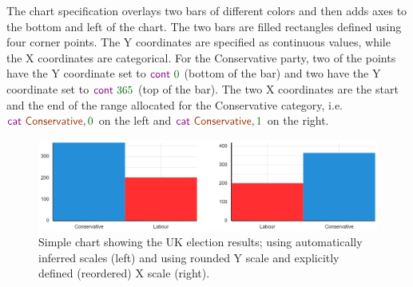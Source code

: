\documentclass{jfp}
\newcommand{\num}[1]{\textcolor{numclr}{#1}}
\newcommand{\strf}[1]{\textnormal{\textcolor{strclr}{\sffamily #1}}}
\newcommand{\kvd}[1]{\textnormal{\textcolor{kvdclr}{\sffamily #1}}}
\begin{document}
\noindent
The chart specification overlays two bars of different colors and then adds axes to the bottom and
left of the chart. The two bars are filled rectangles defined using four corner points. The Y
coordinates are specified as continuous values, while the X coordinates are categorical. For
the Conservative party, two of the points have the Y coordinate set to $\kvd{cont}~\num{0}$ (bottom of the bar)
and two have the Y coordinate set to $\kvd{cont}~\num{365}$ (top of the bar). The two X coordinates
are the start and the end of the range allocated for the \strf{Conservative} category,
i.e.~$\kvd{cat}~\strf{Conservative}, \num{0}$ on the left and $\kvd{cat}~\strf{Conservative}, \num{1}$
on the right.

\begin{figure}
  \includegraphics[scale=0.57]{figures/simple}
  \vspace{0.25em}
  \caption{Simple chart showing the UK election results; using automatically inferred scales (left)
    and using rounded Y scale and explicitly defined (reordered) X scale (right).}
  \label{fig:simple}
\end{figure}
\end{document}
